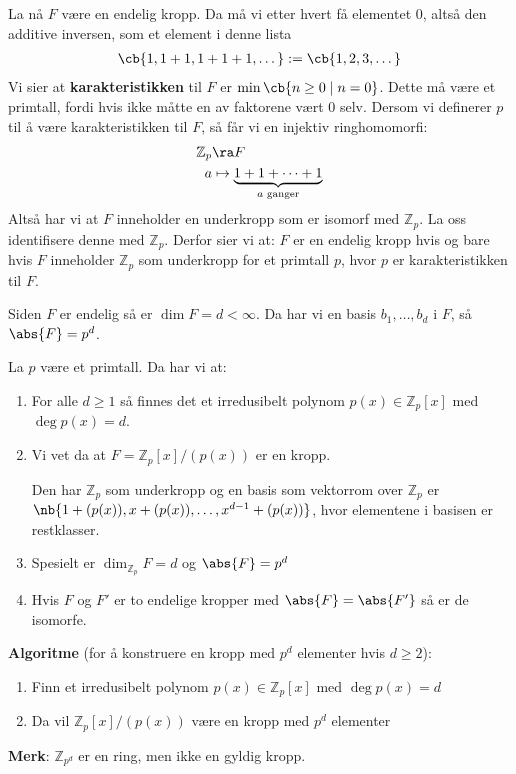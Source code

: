 La nå $F$ være en endelig kropp. Da må vi etter hvert få elementet 0, altså den additive
inversen, som et element i denne lista
\begin{align}
	\cb{1, 1+1, 1+1+1, \dots}:=\cb{1, 2, 3, \dots}
\end{align}
Vi sier at \textbf{karakteristikken} til $F$ er $\min\cb{n\geq 0\mid n=0}$. Dette må være et
primtall, fordi hvis ikke måtte en av faktorene vært 0 selv. Dersom vi definerer $p$ til å
være karakteristikken til $F$, så får vi en injektiv ringhomomorfi:
\begin{align}
	\mathbb{Z}_p & \ra F                                               \\
	a            & \mapsto \underbrace{1+1+\cdots+1}_{a\text{ ganger}}
\end{align}
Altså har vi at $F$ inneholder en underkropp som er isomorf med $\mathbb{Z}_p$. La oss identifisere
denne med $\mathbb{Z}_p$. Derfor sier vi at: $F$ er en endelig kropp hvis og bare hvis $F$
inneholder $\mathbb{Z}_p$ som underkropp for et primtall $p$, hvor $p$ er karakteristikken til $F$.

Siden $F$ er endelig så er $\dim F=d<\infty$. Da har vi en basis $b_1, \dots, b_d$ i $F$, så
$\abs{F}=p^d$.

\begin{theorem*}{}{}
	La $p$ være et primtall. Da har vi at:
	\begin{enumerate}
		\item For alle $d\geq 1$ så finnes det et irredusibelt polynom $p(x)\in \mathbb{Z}_p[x]$ med
		      $\deg p(x)=d$.
		\item Vi vet da at $F=\mathbb{Z}_p[x]/(p(x))$ er en kropp.

		      Den har $\mathbb{Z}_p$ som underkropp og en basis som vektorrom over $\mathbb{Z}_p$ er
		      $\nb{1+(p(x)), x+(p(x)), \dots, x^{d-1}+(p(x))}$, hvor elementene i basisen er restklasser.
		\item Spesielt er $\dim_{\mathbb{Z}_p}F=d$ og $\abs{F}=p^d$
    \item Hvis $F$ og $F'$ er to endelige kropper med $\abs{F}=\abs{F'}$ så er de isomorfe. 
	\end{enumerate}
\end{theorem*}

\textbf{Algoritme} (for å konstruere en kropp med $p^d$ elementer hvis $d\geq 2$):

\begin{enumerate}
  \item Finn et irredusibelt polynom $p(x)\in \mathbb{Z}_p[x]$ med $\deg p(x)=d$
  \item Da vil $\mathbb{Z}_p[x]/(p(x))$ være en kropp med $p^d$ elementer
\end{enumerate}

\textbf{Merk}: $\mathbb{Z}_{p^d}$ er en ring, men ikke en gyldig kropp.
